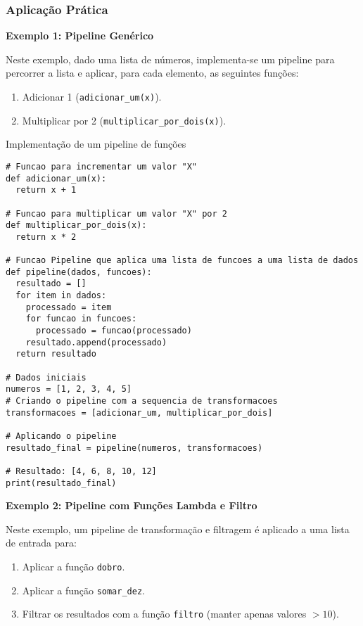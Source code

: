 \subsubsection{Aplicação Prática}
\textbf{Exemplo 1: Pipeline Genérico}

Neste exemplo, dado uma lista de números, implementa-se um pipeline para percorrer a lista e aplicar, para cada elemento, as seguintes funções:
\begin{enumerate}
    \item Adicionar 1 (\texttt{adicionar\_um(x)}).
    \item Multiplicar por 2 (\texttt{multiplicar\_por\_dois(x)}).
\end{enumerate}

\begin{codelisting}{Implementação de um pipeline de funções}
    \label{listing:pipeline_generico}
    \begin{verbatim}
# Funcao para incrementar um valor "X"
def adicionar_um(x):
  return x + 1

# Funcao para multiplicar um valor "X" por 2
def multiplicar_por_dois(x):
  return x * 2

# Funcao Pipeline que aplica uma lista de funcoes a uma lista de dados
def pipeline(dados, funcoes):
  resultado = []
  for item in dados:
    processado = item
    for funcao in funcoes:
      processado = funcao(processado)
    resultado.append(processado)
  return resultado

# Dados iniciais
numeros = [1, 2, 3, 4, 5]
# Criando o pipeline com a sequencia de transformacoes
transformacoes = [adicionar_um, multiplicar_por_dois]

# Aplicando o pipeline
resultado_final = pipeline(numeros, transformacoes)

# Resultado: [4, 6, 8, 10, 12]
print(resultado_final)
    \end{verbatim}
\end{codelisting}

\textbf{Exemplo 2: Pipeline com Funções Lambda e Filtro}

Neste exemplo, um pipeline de transformação e filtragem é aplicado a uma lista de entrada para:
\begin{enumerate}
    \item Aplicar a função \texttt{dobro}.
    \item Aplicar a função \texttt{somar\_dez}.
    \item Filtrar os resultados com a função \texttt{filtro} (manter apenas valores $> 10$).
\end{enumerate}

